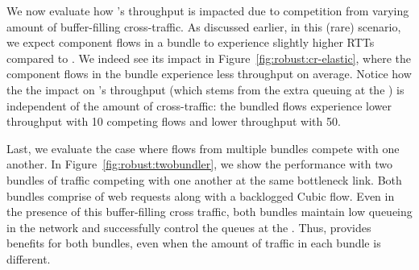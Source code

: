 
We now evaluate how \name's throughput is impacted due to competition from varying amount of buffer-filling cross-traffic.
As discussed earlier, in this (rare) scenario, we expect component flows in a bundle to experience slightly higher RTTs compared to \baseline.
We indeed see its impact in Figure~\ref{fig:robust:cr-elastic}, 
where the component flows in the bundle experience  \bundlerElasticTputWorseness less throughput on average. Notice how the the impact on \name's throughput (which stems from the extra queuing at the \inbox) is independent of the amount of cross-traffic: the bundled flows experience \bundlerElasticTputWorsenessTen lower throughput with 10 competing flows and \bundlerElasticTputWorsenessFifty lower throughput with 50. 


 Last, we evaluate the case where flows from multiple bundles compete with one another. 
In Figure~\ref{fig:robust:twobundler}, we show the performance with two bundles of traffic competing with one another at the same bottleneck link. 
Both bundles comprise of web requests along with a backlogged Cubic flow. 
Even in the presence of this buffer-filling cross traffic, 
both bundles maintain low queueing in the network and successfully control the queues at the \inbox.
Thus, \name provides benefits for both bundles, even when the amount of traffic in each bundle is different.  

